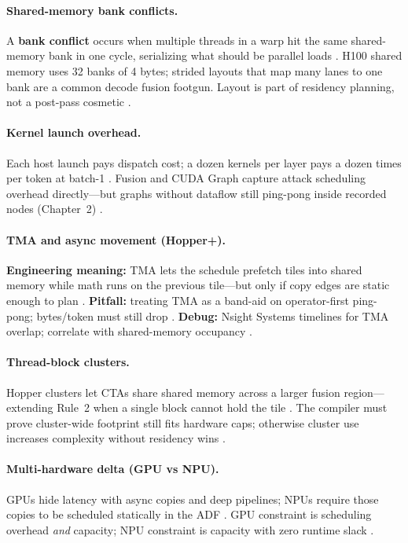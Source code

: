 \paragraph{Shared-memory bank conflicts.}
A \textbf{bank conflict} occurs when multiple threads in a warp hit the same shared-memory bank in one cycle, serializing what should be parallel loads \citep{nvidia2022hopper}.
H100 shared memory uses 32 banks of 4 bytes; strided layouts that map many lanes to one bank are a common decode fusion footgun.
Layout is part of residency planning, not a post-pass cosmetic \citep{shah2024flashattention3}.

\paragraph{Kernel launch overhead.}
Each host launch pays dispatch cost; a dozen kernels per layer pays a dozen times per token at batch-1 \citep{taxbreak2026,memoryfloor2026}.
Fusion and CUDA Graph capture attack scheduling overhead directly---but graphs without dataflow still ping-pong inside recorded nodes (Chapter~2) \citep{nvidia2024cudagraphs}.

\paragraph{TMA and async movement (Hopper+).}
\textbf{Engineering meaning:} TMA lets the schedule prefetch tiles into shared memory while math runs on the previous tile---but only if copy edges are static enough to plan \citep{semianalysis2024tma,nvidia2022hopper}.
\textbf{Pitfall:} treating TMA as a band-aid on operator-first ping-pong; bytes/token must still drop \citep{memoryfloor2026}.
\textbf{Debug:} Nsight Systems timelines for TMA overlap; correlate with shared-memory occupancy \citep{semianalysis2024tma}.

\paragraph{Thread-block clusters.}
Hopper clusters let CTAs share shared memory across a larger fusion region---extending Rule~2 when a single block cannot hold the tile \citep{nvidia2022hopper}.
The compiler must prove cluster-wide footprint still fits hardware caps; otherwise cluster use increases complexity without residency wins \citep{yirage2026}.

\paragraph{Multi-hardware delta (GPU vs NPU).}
GPUs hide latency with async copies and deep pipelines; NPUs require those copies to be scheduled statically in the ADF \citep{amd2024xdna,semianalysis2024tma}.
GPU constraint is scheduling overhead \emph{and} capacity; NPU constraint is capacity with zero runtime slack \citep{wu2024mirage}.

